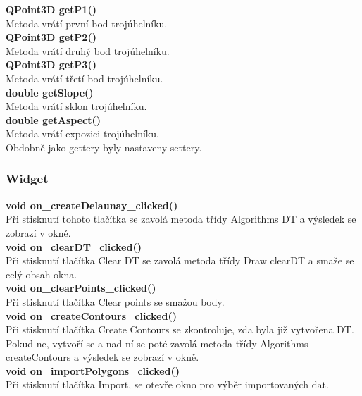 \documentclass[a4paper,11pt,twoside]{article}
\begin{document}
\noindent\textbf{ QPoint3D getP1()}\\
Metoda vrátí první bod trojúhelníku.\\

\noindent\textbf{ QPoint3D getP2()}\\
Metoda vrátí druhý bod trojúhelníku.\\

\noindent\textbf{ QPoint3D getP3()}\\
Metoda vrátí třetí bod trojúhelníku.\\

\noindent\textbf{double getSlope()}\\
Metoda vrátí sklon trojúhelníku.\\

\noindent\textbf{double getAspect()}\\
Metoda vrátí expozici trojúhelníku.\\

\noindent Obdobně jako gettery byly nastaveny settery.

\subsubsection{Widget}

\noindent\textbf{void on\_createDelaunay\_clicked()}\\
Při stisknutí tohoto tlačítka se zavolá metoda třídy Algorithms DT a výsledek se zobrazí v okně. \\

\noindent\textbf{void on\_clearDT\_clicked()}\\
Při stisknutí tlačítka Clear DT se zavolá metoda třídy Draw clearDT a smaže se celý obsah okna.\\

\noindent\textbf{void on\_clearPoints\_clicked()}\\
Při stisknutí tlačítka Clear points se smažou body.\\

\noindent\textbf{void on\_createContours\_clicked()}\\
Při stisknutí tlačítka Create Contours se zkontroluje, zda byla již vytvořena DT. Pokud ne, vytvoří se a nad ní se poté zavolá metoda třídy Algorithms createContours a výsledek se zobrazí v okně.\\

\noindent\textbf{void on\_importPolygons\_clicked()}\\
Při stisknutí tlačítka Import, se otevře okno pro výběr importovaných dat. \\
\end{document}
